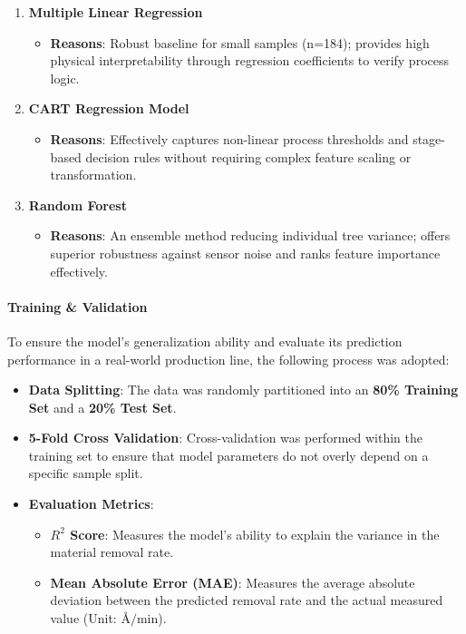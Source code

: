 \documentclass[11pt]{article}
\providecommand{\tightlist}{%
      \setlength{\itemsep}{0pt}\setlength{\parskip}{0pt}}
\begin{document}
\begin{enumerate}
\def\labelenumi{\arabic{enumi}.}
\tightlist
\item
  \textbf{Multiple Linear Regression}

  \begin{itemize}
  \tightlist
  \item
    \textbf{Reasons}: Robust baseline for small samples (n=184);
    provides high physical interpretability through regression
    coefficients to verify process logic.
  \end{itemize}
\item
  \textbf{CART Regression Model}

  \begin{itemize}
  \tightlist
  \item
    \textbf{Reasons}: Effectively captures non-linear process thresholds
    and stage-based decision rules without requiring complex feature
    scaling or transformation.
  \end{itemize}
\item
  \textbf{Random Forest}

  \begin{itemize}
  \tightlist
  \item
    \textbf{Reasons}: An ensemble method reducing individual tree
    variance; offers superior robustness against sensor noise and ranks
    feature importance effectively.
  \end{itemize}
\end{enumerate}

    \paragraph{Training \& Validation}\label{training-validation}

To ensure the model's generalization ability and evaluate its prediction
performance in a real-world production line, the following process was
adopted:

\begin{itemize}
\tightlist
\item
  \textbf{Data Splitting}: The data was randomly partitioned into an
  \textbf{80\% Training Set} and a \textbf{20\% Test Set}.
\item
  \textbf{5-Fold Cross Validation}: Cross-validation was performed
  within the training set to ensure that model parameters do not overly
  depend on a specific sample split.
\item
  \textbf{Evaluation Metrics}:

  \begin{itemize}
  \tightlist
  \item
    \textbf{\(R^2\) Score}: Measures the model's ability to explain the
    variance in the material removal rate.
  \item
    \textbf{Mean Absolute Error (MAE)}: Measures the average absolute
    deviation between the predicted removal rate and the actual measured
    value (Unit: \(\text{Å/min}\)).
  \end{itemize}
\end{itemize}
\end{document}

